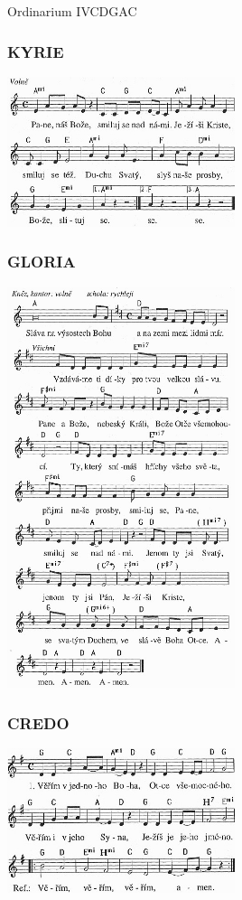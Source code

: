 \setcounter{page}{111}
\begin{song}{Ordinarium IV}{CDGAC}{}
\subsubsection*{KYRIE}
\includegraphics[width=0.5\textwidth]{noty/c_o4-kyrie} 
\subsubsection*{GLORIA}
\includegraphics[width=0.5\textwidth]{noty/c_o4-gloria} 
\columnbreak
\subsubsection*{CREDO}
\includegraphics[width=0.5\textwidth]{noty/c_o4-credo} 

\end{song}

